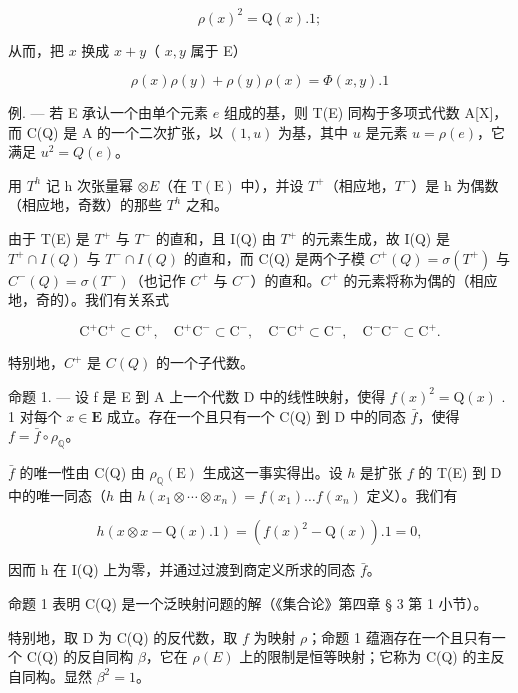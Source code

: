 \[
\rho (x) ^ {2} = \mathrm{Q} (x). 1;\tag{1}
\]

从而，把 \(x\) 换成 \(x + y\)（ \(x, y\) 属于 E）

\[
\rho (x) \rho (y) + \rho (y) \rho (x) = \Phi (x, y). 1\tag{2}
\]

例. --- 若 E 承认一个由单个元素 \(e\) 组成的基，则 T(E) 同构于多项式代数 A{[}X{]}，而 C(Q) 是 A 的一个二次扩张，以 \((1, u)\) 为基，其中 \(u\) 是元素 \(u = \rho(e)\)，它满足 \(u^2 = Q(e)\)。

  用 \(T^{h}\) 记 h 次张量幂 \(\otimes E\)（在 \(\mathrm{T}(\mathrm{E})\) 中），并设 \(T^{+}\)（相应地，\(T^{-}\)）是 h 为偶数（相应地，奇数）的那些 \(T^{h}\) 之和。

  由于 T(E) 是 \(T^{+}\) 与 \(T^{-}\) 的直和，且 I(Q) 由 \(T^{+}\) 的元素生成，故 I(Q) 是 \(T^{+} \cap I(Q)\) 与 \(T^{-} \cap I(Q)\) 的直和，而 C(Q) 是两个子模 \(C^{+}(Q) = \sigma(T^{+})\) 与 \(C^{-}(Q) = \sigma(T^{-})\)（也记作 \(C^{+}\) 与 \(C^{-}\)）的直和。\(C^{+}\) 的元素将称为偶的（相应地，奇的）。我们有关系式

\[
\mathrm{C} ^ {+} \mathrm{C} ^ {+} \subset \mathrm{C} ^ {+}, \quad \mathrm{C} ^ {+} \mathrm{C} ^ {-} \subset \mathrm{C} ^ {-}, \quad \mathrm{C} ^ {-} \mathrm{C} ^ {+} \subset \mathrm{C} ^ {-}, \quad \mathrm{C} ^ {-} \mathrm{C} ^ {-} \subset \mathrm{C} ^ {+}.\tag{3}
\]

  特别地，\(C^{+}\) 是 \(C(Q)\) 的一个子代数。

命题 1. --- 设 f 是 E 到 A 上一个代数 D 中的线性映射，使得 \(f(x)^{2} = \mathrm{Q}(x)\) . 1 对每个 \(x \in \mathbf{E}\) 成立。存在一个且只有一个 C(Q) 到 D 中的同态 \(\bar{f}\)，使得 \(f = \bar{f} \circ \rho_{\mathbb{Q}}\)。

  \(\bar{f}\) 的唯一性由 C(Q) 由 \(\rho_{\mathbb{Q}}(\mathrm{E})\) 生成这一事实得出。设 \(h\) 是扩张 \(f\) 的 T(E) 到 D 中的唯一同态（\(h\) 由 \(h(x_1 \otimes \cdots \otimes x_n) = f(x_1) \ldots f(x_n)\) 定义）。我们有

\[
h (x \otimes x - \mathrm{Q} (x). 1) = (f (x) ^ {2} - \mathrm{Q} (x)). 1 = 0,
\]

  因而 h 在 I(Q) 上为零，并通过过渡到商定义所求的同态 \(\bar{f}\)。

  命题 1 表明 C(Q) 是一个泛映射问题的解（《集合论》第四章 § 3 第 1 小节）。

  特别地，取 D 为 C(Q) 的反代数，取 \(f\) 为映射 \(\rho\)；命题 1 蕴涵存在一个且只有一个 C(Q) 的反自同构 \(\beta\)，它在 \(\rho(E)\) 上的限制是恒等映射；它称为 C(Q) 的主反自同构。显然 \(\beta^{2} = 1\)。

